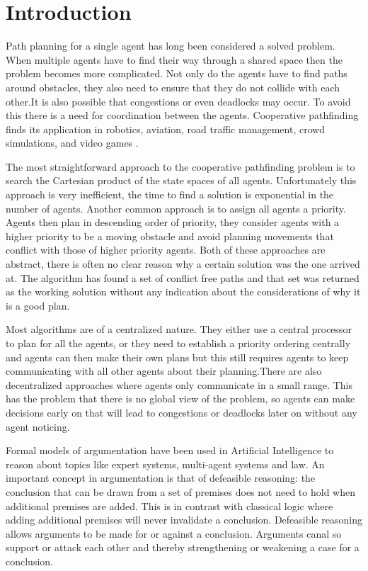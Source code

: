 \section{Introduction}\label{sec:intro}
Path planning for a single agent has long been considered a solved problem.
When multiple agents have to find their way through a shared space then the
problem becomes more complicated. Not only do the agents have to find paths
around obstacles, they also need to ensure that they do not collide with each
other.It is also possible that congestions or even deadlocks may occur. To
avoid this there is a need for coordination between the agents.
Cooperative pathfinding finds its application in robotics, aviation, road
traffic management, crowd simulations, and video games \cite{standley2011}.

The most straightforward approach to the cooperative pathfinding problem is to
search the Cartesian product of the state spaces of all agents. Unfortunately
this approach is very inefficient, the time to find a solution is exponential
in the number of agents. Another common approach is to assign all agents a
priority. Agents then plan in descending order of priority, they consider
agents with a higher priority to be a moving obstacle and avoid planning
movements that conflict with those of higher priority agents. Both of these
approaches are abstract, there is often no clear reason why a certain solution
was the one arrived at. The algorithm has found a set of conflict free paths
and that set was returned as the working solution without any indication about
the considerations of why it is a good plan.

Most algorithms are of a centralized nature. They either use a central
processor to plan for all the agents, or they need to establish a priority
ordering centrally and agents can then make their own plans but this still
requires agents to keep communicating with all other agents about their
planning.There are also decentralized approaches where agents only communicate
in a small range. This has the problem that there is no global view of the
problem, so agents can make decisions early on that will lead to congestions or
deadlocks later on without any agent noticing.

Formal models of argumentation have been used in Artificial Intelligence to
reason about topics like expert systems, multi-agent systems and law. An
important concept in argumentation is that of defeasible reasoning: the
conclusion that can be drawn from a set of premises does not need to hold when
additional premises are added. This is in contrast with classical logic where
adding additional premises will never invalidate a conclusion. Defeasible
reasoning allows arguments to be made for or against a conclusion. Arguments
canal so support or attack each other and thereby strengthening or weakening a
case for a conclusion.

